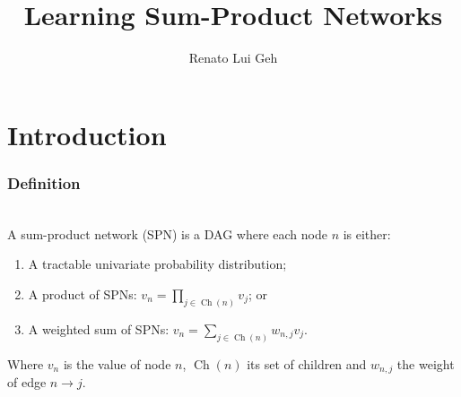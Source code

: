 \documentclass[usenames,dvipsnames]{beamer}
\title{Learning Sum-Product Networks}
\date{}
\author{Renato Lui Geh}
\institute{Institute of Mathematics and Statistics --- University of São Paulo}
\DeclareMathOperator*{\Ch}{\text{Ch}}
\begin{document}
\maketitle

\section{Introduction}

\begin{frame}
  \frametitle{Definition}
  \begin{definition}~\\
    A sum-product network (SPN) is a DAG where each node $n$ is either:
    \begin{enumerate}
      \item A tractable univariate probability distribution;
      \item A product of SPNs: $v_n=\prod_{j\in\Ch(n)}v_j$; or
      \item A weighted sum of SPNs: $v_n=\sum_{j\in\Ch(n)}w_{n,j}v_j$.
    \end{enumerate}
    Where $v_n$ is the value of node $n$, $\Ch(n)$ its set of children and $w_{n,j}$ the weight of
    edge $n\to j$.
  \end{definition}
\end{frame}
\end{document}
